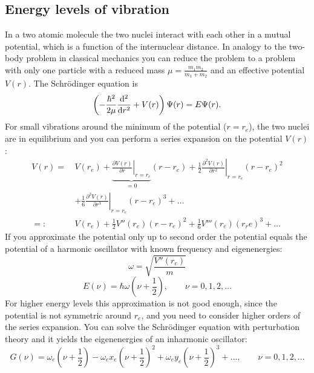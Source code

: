 \subsection{Energy levels of vibration}
In a two atomic molecule the two nuclei interact with each other in a mutual potential, which is a function of the internuclear distance. 
In analogy to the two-body problem in classical mechanics you can reduce the problem to a problem with only one particle with a 
reduced mass $\mu = \frac{m_1 m_2}{m_1 + m_2}$ and an effective potential $V(r)$. The Schrödinger equation is 
\begin{equation}
\label{eq_schroedinger}
  \left( - \frac{\hbar^2}{2 \mu} \frac{\mathrm{d}^2}{\mathrm{d} r^2} + V(r) \right) \Psi(r) = E \Psi(r) .
\end{equation}
For small vibrations around the minimum of the potential ($r = r_e$), the two nuclei are in equilibrium and you can perform a 
series expansion on the potential $V(r)$:
\begin{equation}
\begin{split}
\label{eq_potential_series}
  V(r) = \, &  V(r_e) + \underbrace{\left. \frac{\partial V(r)}{\partial r} \right|_{r=r_e}}_{=0} (r-r_e)
     + \left. \frac{1}{2} \frac{\partial^2 V(r)}{\partial r^2} \right|_{r=r_e}(r-r_e)^2 \\
  & + \left. \frac{1}{6} \frac{\partial^3 V(r)}{\partial r^3} \right|_{r=r_e}(r-r_e)^3 + \ldots \\
  =: & V(r_e) + \frac{1}{2} V''(r_e)(r-r_e)^2 + \frac{1}{6} V'''(r_e)(r_re)^3 + \ldots
\end{split}
\end{equation}
If you approximate the potential only up to second order the potential equals the potential of a harmonic oscillator with known frequency and 
eigenenergies:
\begin{equation}
\label{eq:ho:freq}
  \omega = \sqrt{\frac{V''(r_e)}{m}}
\end{equation}
\begin{equation}
\label{eq:ho:energy}
  E(\nu) =  \hbar \omega \left( \nu + \frac{1}{2} \right), \qquad \nu = 0, 1, 2, \ldots
\end{equation}
For higher energy levels this approximation is not good enough, since the potential is not symmetric around $r_e$, 
and you need to consider higher orders of the series expansion. You can solve the
Schrödinger equation with perturbation theory and it yields the eigenenergies of an inharmonic oscillator:
\begin{equation}
\label{eq:iho:energy}
  G(\nu) = \omega_e \left( \nu + \frac{1}{2} \right) - \omega_e x_e \left( \nu + \frac{1}{2} \right)^2 
            + \omega_e y_e \left( \nu + \frac{1}{2} \right)^3 + \ldots, \qquad \nu = 0, 1, 2, \ldots
\end{equation}
